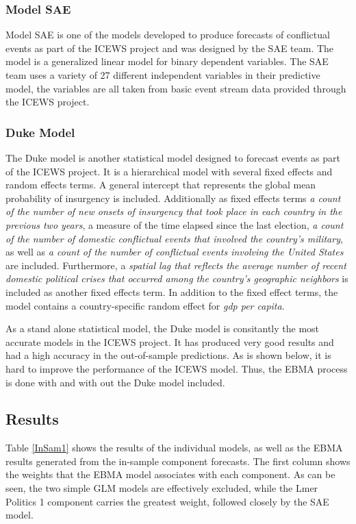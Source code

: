 \documentclass[pdftex,12pt,fullpage,oneside]{amsart}
\begin{document}
\subsubsection{Model SAE}
Model SAE is one of the models developed to produce forecasts of
conflictual events as part of the ICEWS project and was designed by
the SAE team. The model is a generalized linear model for binary
dependent variables. The SAE team uses a variety of 27 different
independent variables in their predictive model, the variables are all
taken from basic event stream data provided through the ICEWS
project. 

\subsubsection{Duke Model}
The Duke model is another statistical model designed to forecast
events as part of the ICEWS project.  It is a hierarchical model with
several fixed effects and random effects terms. A general intercept
that represents the global mean probability of insurgency is
included. Additionally as fixed effects terms \textit{a count of the number of
new onsets of insurgency that took place in each country in the
previous two years}, a measure of the time elapsed since the last
election, \textit{a count of the number of domestic conflictual events that
involved the country's military}, as well as \textit{a count of the number of
conflictual events involving the United States} are
included. Furthermore, a \textit{spatial lag that reflects the average number
of recent domestic political crises that occurred among the country's
geographic neighbors} is included as another fixed effects term. In
addition to the fixed effect terms, the model contains a
country-specific random effect for \textit{gdp per capita}.

As a stand alone statistical model, the Duke model is consitantly the
most accurate models in the ICEWS project. It has produced very good
results and had a high accuracy in the out-of-sample predictions. As
is shown below, it is hard to improve the performance of the ICEWS
model. Thus, the EBMA process is done with and with out the Duke model
included.


\subsection{Results}

Table \ref{InSam1} shows the results of the individual models, as well
as the EBMA results generated from the in-sample component
forecasts. The first column shows the weights that the EBMA model
associates with each component. As can be seen, the two simple GLM
models are effectively excluded, while the Lmer Politics 1 component
carries the greatest weight, followed closely by the SAE model.
\end{document}
